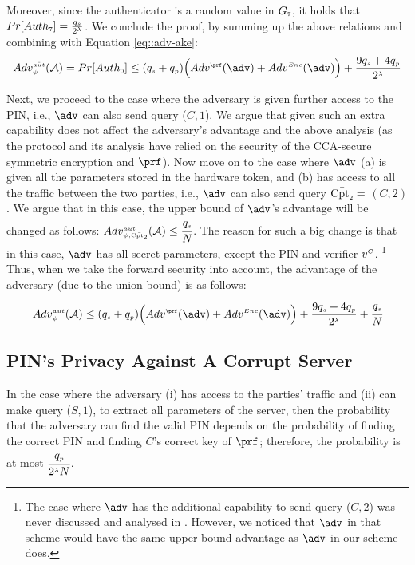  Moreover, since the authenticator is a random value in $G_{\scriptscriptstyle 7}$, it holds that $Pr[Auth_{\scriptscriptstyle 7}]=\frac{q_{\scriptscriptstyle  s}}{2^{\scriptscriptstyle \lambda}}$. We conclude the proof, by summing up the above relations and combining with Equation \ref{eq::adv-ake}: 
  \begin{equation}
 Adv_{\sss \psi}^{\sss \bar {aut}}(\A) = Pr[Auth_{\sss  0}] \leq (q_{\sss s} + q_{\sss p})\Big(Adv^{\sss\prf}(\adv)+Adv^{\sss Enc}(\adv)\Big)+\frac{9q_{\sss  s}+4q_{\sss  p}}{2^{\sss \lambda}}%
 \end{equation}
 
 
Next, we proceed to the case where the adversary is given further access to the PIN, i.e., $\adv$ can also send query  \corrupt($C, 1$). We argue that given such an extra capability does not affect the adversary's advantage and the above analysis (as the protocol and its analysis have relied on the security of the CCA-secure symmetric encryption and $\prf$). Now move on to the case where $\adv$ (a) is given all the parameters stored in the hardware token, and (b) has access to all the traffic between the two parties, i.e., $\adv$ can also send query  $\bar{\text{Cpt}_{\scriptscriptstyle  2}} =$ \corrupt$(C, 2)$. We argue that in this case, the upper bound of $\adv$'s advantage will be changed as follows:  $Adv_{\scriptscriptstyle\psi, \bar{\text{Cpt}_{\scriptscriptstyle  2}}}^{\scriptscriptstyle  aut}(\mathcal{A})\leq  \cfrac{q_{\scriptscriptstyle  s}}{N}$. The reason for such a big change is that in this case, $\adv$ has all secret parameters, except the PIN and verifier ${v}^{\scriptscriptstyle C}$. \footnote{The case where $\adv$ has the additional capability to send query \corrupt($C, 2$) was never discussed and analysed in \cite{BressonCP03}. However, we noticed that $\adv$ in that scheme would have the same upper bound advantage as $\adv$ in our scheme does.} Thus, when we take the forward security into account, the advantage of the adversary (due to the union bound)  is as follows: 
%
  \begin{equation*}
 Adv_{\sss \psi}^{\sss  aut}(\A)  \leq (q_{\sss s} + q_{\sss p})\Big(Adv^{\sss\prf}(\adv)+Adv^{\sss Enc}(\adv)\Big)+\frac{9q_{\sss s}+4q_{\sss  p}}{2^{\sss \lambda}}+  \cfrac{q_{\sss  s}}{N}
 \end{equation*}


\subsection{PIN's Privacy Against A Corrupt Server} 

In the case where the adversary (i) has access to the parties' traffic and (ii) can make query \corrupt($S, 1$), to extract all parameters of the server, then the probability that the adversary can find the valid PIN depends on the probability of finding the correct PIN and finding $C$'s correct key of $\prf$; therefore, the probability is at most $\cfrac{q_{\scriptscriptstyle  p}}{2^{\scriptscriptstyle \lambda}N}$. 


